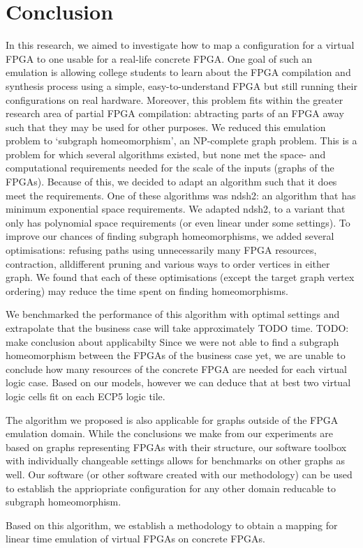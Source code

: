 \chapter{Conclusion}
\begin{minipage}{\textwidth}
In this research, we aimed to investigate how to map a configuration for a virtual FPGA to one usable for a real-life concrete FPGA. One goal of such an emulation is allowing college students to learn about the FPGA compilation and synthesis process using a simple, easy-to-understand FPGA but still running their configurations on real hardware. Moreover, this problem fits within the greater research area of partial FPGA compilation: abtracting parts of an FPGA away such that they may be used for other purposes.  We reduced this emulation problem to `subgraph homeomorphism', an NP-complete graph problem. This is a problem for which several algorithms existed, but none met the space- and computational requirements needed for the scale of the inputs (graphs of the FPGAs). Because of this, we decided to adapt an algorithm such that it does meet the requirements. One of these algorithms was ndsh2: an algorithm that has minimum exponential space requirements. We adapted ndsh2, to a variant that only has polynomial space requirements (or even linear under some settings). To improve our chances of finding subgraph homeomorphisms, we added several optimisations: refusing paths using unnecessarily many FPGA resources, contraction, alldifferent pruning and various ways to order vertices in either graph. We found that each of these optimisations (except the target graph vertex ordering) may reduce the time spent on finding homeomorphisms.

We benchmarked the performance of this algorithm with optimal settings and extrapolate that the business case will take approximately {\color{red} TODO} time. {\color{red} TODO: make conclusion about applicabilty} Since we were not able to find a subgraph homeomorphism between the FPGAs of the business case yet, we are unable to conclude how many resources of the concrete FPGA are needed for each virtual logic case. Based on our models, however we can deduce that at best two virtual logic cells fit on each ECP5 logic tile.

The algorithm we proposed is also applicable for graphs outside of the FPGA emulation domain. While the conclusions we make from our experiments are based on graphs representing FPGAs with their structure, our software toolbox with individually changeable settings allows for benchmarks on other graphs as well. Our software (or other software created with our methodology) can be used to establish the appriopriate configuration for any other domain reducable to subgraph homeomorphism.

Based on this algorithm, we establish a methodology to obtain a mapping for linear time emulation of virtual FPGAs on concrete FPGAs.
\end{minipage}